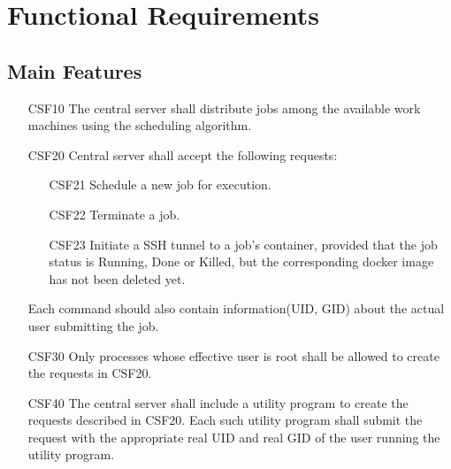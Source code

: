 \section{Functional Requirements}
\subsection{Main Features}
\begin{enumerate}
  \item[CSF10] The central server shall distribute \glspl{job}
    among the available work machines using the scheduling algorithm.
  \item[CSF20] Central server shall accept the following requests:
  \begin{enumerate}
    \item[CSF21] Schedule a new \gls{job} for execution.
    \item[CSF22] Terminate a \gls{job}.
    \item[CSF23] Initiate a SSH tunnel to a \gls{job}'s container, provided that the
      \gls{job status} is Running, Done or Killed, but the corresponding docker image
      has not been deleted yet.
  \end{enumerate}
    Each command should also contain information(\gls{UID}, \gls{GID}) about the actual user submitting the job.
  \item[CSF30] Only processes whose effective user is root shall be allowed to create the requests in CSF20.
  \item[CSF40] The central server shall include a utility program to create the requests described in CSF20.
    Each such utility program shall submit the request with the appropriate real \gls{UID} and real \gls{GID}
    of the user running the utility program.


\end{enumerate}
